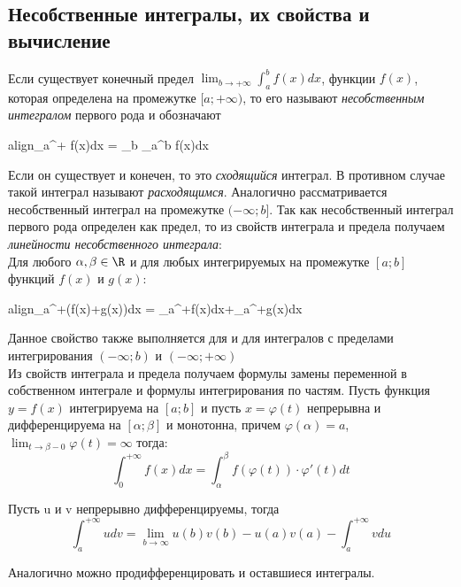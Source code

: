 \documentclass[oneside]{book}
\newcommand{\boxedeq}[2]{\begin{empheq}[box={\fboxsep=6pt\fbox}]{align}\label{#1}#2\end{empheq}}
\begin{document}
\begin{enumerate}
\begin{itemize}
\begin{enumerate}
					\chapter{Несобственные интегралы, их свойства и вычисление\\}
					Если существует конечный предел $\lim_{b\to{+\infty}} \int_{a}^b f(x)dx$, функции $f(x)$, которая определена на промежутке $[a;+\infty)$, то его называют \textit{несобственным интегралом} первого рода и обозначают 
					\begin{center}
						\boxedeq{eq:*}{\int_{a}^{+\infty} f(x)dx = \lim_{b\to{+\infty}} \int_{a}^b f(x)dx}
					\end{center}
					Если он существует и конечен, то это \textit{сходящийся} интеграл. В противном случае такой интеграл называют \textit{расходящимся}. Аналогично рассматривается несобственный интеграл на промежутке $(-\infty;b]$. Так как несобственный интеграл первого рода определен как предел, то из свойств интеграла и предела получаем \textit{линейности несобственного интеграла}:\\

					Для любого $\alpha, \beta \in \R$ и для любых интегрируемых на промежутке $[a;b]$ функций $f(x)$ и $g(x)$:

					\begin{center}
						\boxedeq{eq*:}{\int_{a}^{+\infty}(\alpha f(x)+\beta g(x))dx = \alpha \int_{a}^{+\infty}f(x)dx+\beta \int_{a}^{+\infty}g(x)dx}
					\end{center}
					Данное свойство также выполняется для и для интегралов с пределами интегрирования $(-\infty;b)$ и $(-\infty;+\infty)$\\

					Из свойств интеграла и предела получаем формулы замены переменной в собственном интеграле и формулы интегрирования по частям.
					Пусть функция $y=f(x)$ интегрируема на $[a;b]$ и пусть $x=\varphi(t)$ непрерывна и дифференцируема на $[\alpha;\beta]$ и монотонна, причем $\varphi(\alpha)=a$, $\lim_{t\to{\beta-0}}\varphi(t)=\infty$ тогда:
					$$\int_{0}^{+\infty}f(x)dx=\int_{\alpha}^{\beta}f(\varphi(t))\cdot\varphi'(t)dt$$
					{\color{red}{\huge Я НЕ ПОНИМАЮ, ЧТО ДАЛЬШЕ НАПИСАНО. ЧТО ЭТО ЗНАЧИТ? ПОМОГИТЕ!!!}

						Пусть u и v непрерывно дифференцируемы, тогда 
						$$\int_{a}^{+\infty} udv = \lim_{b\to\infty}u(b)v(b)-u(a)v(a)-\int_{a}^{+\infty}vdu$$}
					Аналогично можно продифференцировать и оставшиеся интегралы.\\


\end{enumerate}
\end{itemize}
\end{enumerate}
\end{document}
